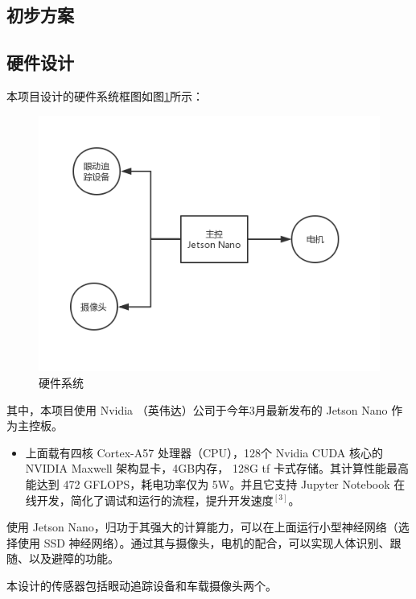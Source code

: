 \documentclass{article}
\begin{document}
\begin{spacing}{1.5}
\section{初步方案}

    \subsection{硬件设计}

本项目设计的硬件系统框图如图\ref{fig:hardware}所示：

\begin{figure}[H]
    \centering
    \includegraphics[scale=0.4]{fig/hardware.png}
    \caption{硬件系统}
    \label{fig:hardware}
\end{figure}


其中，本项目使用 Nvidia （英伟达）公司于今年3月最新发布的 Jetson Nano 作为主控板。

\begin{itemize}
    \item 上面载有四核 Cortex-A57 处理器（CPU），128个 Nvidia CUDA 核心的 NVIDIA Maxwell 架构显卡，4GB内存， 128G tf 卡式存储。其计算性能最高能达到 472 GFLOPS，耗电功率仅为 5W。并且它支持 Jupyter Notebook 在线开发，简化了调试和运行的流程，提升开发速度$^[3]$。
\end{itemize}

使用 Jetson Nano，归功于其强大的计算能力，可以在上面运行小型神经网络（选择使用 SSD 神经网络）。通过其与摄像头，电机的配合，可以实现人体识别、跟随、以及避障的功能。

本设计的传感器包括眼动追踪设备和车载摄像头两个。


\end{spacing}
\end{document}

